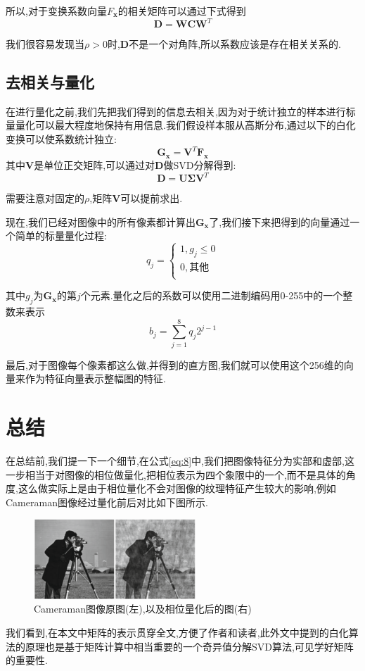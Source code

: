 \documentclass[UTF8,adobefonts]{ctexart}
\begin{document}
所以,对于变换系数向量$F_\mathbf{x}$的相关矩阵可以通过下式得到
\begin{equation}\label{eq:13}
\mathbf{D}=\mathbf{WCW}^T
\end{equation}

我们很容易发现当$\rho>0$时,$\mathbf{D}$不是一个对角阵,所以系数应该是存在相关关系的.

\subsection{去相关与量化}
在进行量化之前,我们先把我们得到的信息去相关,因为对于统计独立的样本进行标量量化可以最大程度地保持有用信息.我们假设样本服从高斯分布,通过以下的白化变换可以使系数统计独立:
\begin{equation}\label{eq:14}
\mathbf{G_x}=\mathbf{V}^T\mathbf{F_x}
\end{equation}
其中$\mathbf{V}$是单位正交矩阵,可以通过对$\mathbf{D}$做SVD分解得到:
\begin{equation}\label{eq:15}
\mathbf{D}=\mathbf{U \Sigma V}^T
\end{equation}

需要注意对固定的$\rho$,矩阵$\mathbf{V}$可以提前求出.

现在,我们已经对图像中的所有像素都计算出$\mathbf{G_x}$了,我们接下来把得到的向量通过一个简单的标量量化过程:
\begin{equation}\label{eq:16}
      q_j=      
      \left\{
       \begin{array}{l}
       1, g_j \le 0   \\
       0, \text{其他}  \\
       \end{array}
      \right.
      \end{equation}

其中$g_j$为$\mathbf{G_x}$的第$j$个元素.量化之后的系数可以使用二进制编码用0-255中的一个整数来表示
\begin{equation}\label{eq:17}
b_j=\sum_{j=1}^8 q_j 2^{j-1}
\end{equation}

最后,对于图像每个像素都这么做,并得到的直方图,我们就可以使用这个256维的向量来作为特征向量表示整幅图的特征.

\section{总结}
在总结前,我们提一下一个细节,在公式\ref{eq:8}中,我们把图像特征分为实部和虚部,这一步相当于对图像的相位做量化,把相位表示为四个象限中的一个,而不是具体的角度,这么做实际上是由于相位量化不会对图像的纹理特征产生较大的影响,例如Cameraman图像经过量化前后对比如下图所示.\cite{brahnam2014local}
\begin{figure}[h]
\centering
\includegraphics[height=3cm]{cameraman.png}

\caption{Cameraman图像原图(左),以及相位量化后的图(右)}
\label{cm}
\end{figure}

我们看到,在本文中矩阵的表示贯穿全文,方便了作者和读者,此外文中提到的白化算法的原理也是基于矩阵计算中相当重要的一个奇异值分解SVD算法,可见学好矩阵的重要性.
\nocite{heikkila2014local,ojansivu2008blur}

\end{document}
